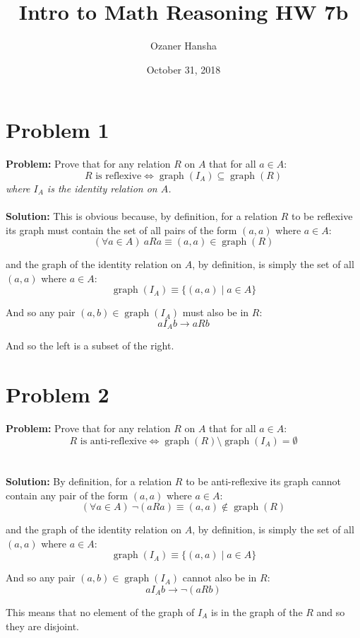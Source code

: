 \documentclass{article}
\begin{document}
\title{Intro to Math Reasoning HW 7b}
\author{Ozaner Hansha}
\date{October 31, 2018}
\maketitle

\section*{Problem 1}
\textbf{Problem:} Prove that for any relation $R$ on $A$ that for all $a\in A$:
$$R\text{ is reflexive}\iff\operatorname{graph}(I_A)\subseteq\operatorname{graph}(R)$$
\textit{where $I_A$ is the identity relation on $A$.}
\\\\
\textbf{Solution:} This is obvious because, by definition, for a relation $R$ to be reflexive its graph must contain the set of all pairs of the form $(a,a)$ where $a\in A$:
$$(\forall a\in A)\ aRa\equiv(a,a)\in\operatorname{graph}(R)$$

and the graph of the identity relation on $A$, by definition, is simply the set of all $(a,a)$ where $a\in A$:
$$\operatorname{graph}(I_A)\equiv\{(a,a)\mid a\in A\}$$

And so any pair $(a,b)\in\operatorname{graph}(I_A)$ must also be in $R$:
$$aI_Ab\rightarrow aRb$$

And so the left is a subset of the right.

\section*{Problem 2}
\textbf{Problem:} Prove that for any relation $R$ on $A$ that for all $a\in A$:
$$R\text{ is anti-reflexive}\iff\operatorname{graph}(R)\setminus\operatorname{graph}(I_A)=\emptyset$$
\\\\
\textbf{Solution:} By definition, for a relation $R$ to be anti-reflexive its graph cannot contain any pair of the form $(a,a)$ where $a\in A$:
$$(\forall a\in A)\ \neg(aRa)\equiv(a,a)\not\in\operatorname{graph}(R)$$

and the graph of the identity relation on $A$, by definition, is simply the set of all $(a,a)$ where $a\in A$:
$$\operatorname{graph}(I_A)\equiv\{(a,a)\mid a\in A\}$$

And so any pair $(a,b)\in\operatorname{graph}(I_A)$ cannot also be in $R$:
$$aI_Ab\rightarrow\neg(aRb)$$

This means that no element of the graph of $I_A$ is in the graph of the $R$ and so they are disjoint.
\end{document}
